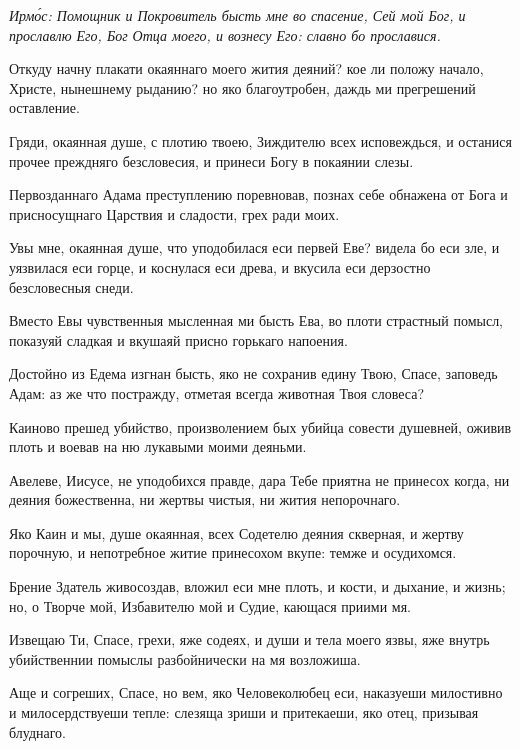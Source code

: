 \mychapterending

 

\itshape Ирм\'{о}с\normalfont{}: Помощник и Покровитель бысть мне во спасение, Сей мой Бог, и прославлю Его, Бог Отца моего, и вознесу Его: славно бо прославися.

Откуду начну плакати окаяннаго моего жития деяний? кое ли положу начало, Христе, нынешнему рыданию? но яко благоутробен, даждь ми прегрешений оставление.

Гряди, окаянная душе, с плотию твоею, Зиждителю всех исповеждься, и останися прочее преждняго безсловесия, и принеси Богу в покаянии слезы.

Первозданнаго Адама преступлению поревновав, познах себе обнажена от Бога и присносущнаго Царствия и сладости, грех ради моих.

Увы мне, окаянная душе, что уподобилася еси первей Еве? видела бо еси зле, и уязвилася еси горце, и коснулася еси древа, и вкусила еси дерзостно безсловесныя снеди.

Вместо Евы чувственныя мысленная ми бысть Ева, во плоти страстный помысл, показуяй сладкая и вкушаяй присно горькаго напоения.

Достойно из Едема изгнан бысть, яко не сохранив едину Твою, Спасе, заповедь Адам: аз же что постражду, отметая всегда животная Твоя словеса?

Каиново прешед убийство, произволением бых убийца совести душевней, оживив плоть и воевав на ню лукавыми моими деяньми.

Авелеве, Иисусе, не уподобихся правде, дара Тебе приятна не принесох когда, ни деяния божественна, ни жертвы чистыя, ни жития непорочнаго.

Яко Каин и мы, душе окаянная, всех Содетелю деяния скверная, и жертву порочную, и непотребное житие принесохом вкупе: темже и осудихомся.

Брение Здатель живосоздав, вложил еси мне плоть, и кости, и дыхание, и жизнь; но, о Творче мой, Избавителю мой и Судие, кающася приими мя.

Извещаю Ти, Спасе, грехи, яже содеях, и души и тела моего язвы, яже внутрь убийственнии помыслы разбойнически на мя возложиша.

Аще и согреших, Спасе, но вем, яко Человеколюбец еси, наказуеши милостивно и милосердствуеши тепле: слезяща зриши и притекаеши, яко отец, призывая блуднаго.

